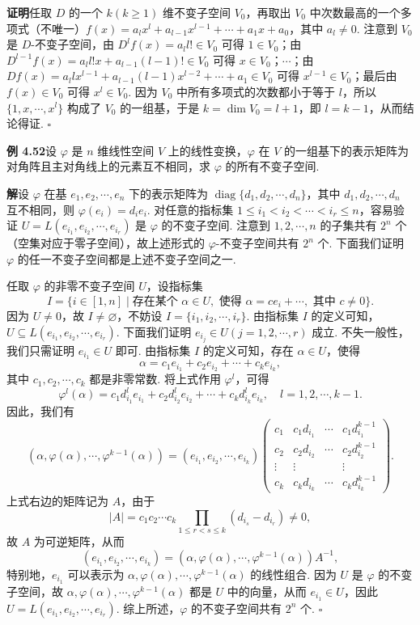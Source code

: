 \documentclass[UTF8,12pt,a4paper,fontset=fandol]{ctexart}
\begin{document}
\noindent\textbf{证明}\quad 任取 $D$ 的一个 $k(k\ge1)$ 维不变子空间 $V_0$，再取出 $V_0$ 中次数最高的一个多项式（不唯一）$f(x)=a_lx^l+a_{l-1}x^{l-1}+\cdots+a_1x+a_0$，其中 $a_l\ne0$. 注意到 $V_0$ 是 $D$-不变子空间，由 $D^lf(x)=a_ll!\in V_0$ 可得 $1\in V_0$；由 $D^{l-1}f(x)=a_ll!x+a_{l-1}(l-1)!\in V_0$ 可得 $x\in V_0$；$\cdots$；由 $Df(x)=a_llx^{l-1}+a_{l-1}(l-1)x^{l-2}+\cdots+a_1\in V_0$ 可得 $x^{l-1}\in V_0$；最后由 $f(x)\in V_0$ 可得 $x^l\in V_0$. 因为 $V_0$ 中所有多项式的次数都小于等于 $l$，所以 $\{1,x,\cdots,x^l\}$ 构成了 $V_0$ 的一组基，于是 $k=\dim V_0=l+1$，即 $l=k-1$，从而结论得证. $\square$

\noindent\textbf{例 4.52}\quad 设 $\varphi$ 是 $n$ 维线性空间 $V$ 上的线性变换，$\varphi$ 在 $V$ 的一组基下的表示矩阵为对角阵且主对角线上的元素互不相同，求 $\varphi$ 的所有不变子空间.

\noindent\textbf{解}\quad 设 $\varphi$ 在基 $e_1,e_2,\cdots,e_n$ 下的表示矩阵为 $\operatorname{diag}\{d_1,d_2,\cdots,d_n\}$，其中 $d_1,d_2,\cdots,d_n$ 互不相同，则 $\varphi(e_i)=d_ie_i$. 对任意的指标集 $1\le i_1<i_2<\cdots<i_r\le n$，容易验证 $U=L(e_{i_1},e_{i_2},\cdots,e_{i_r})$ 是 $\varphi$ 的不变子空间. 注意到 $1,2,\cdots,n$ 的子集共有 $2^n$ 个（空集对应于零子空间），故上述形式的 $\varphi$-不变子空间共有 $2^n$ 个. 下面我们证明 $\varphi$ 的任一不变子空间都是上述不变子空间之一.

任取 $\varphi$ 的非零不变子空间 $U$，设指标集
\[
I=\{i\in[1,n]\mid \text{存在某个 }\alpha\in U,\text{ 使得 }\alpha=ce_i+\cdots,\text{ 其中 }c\ne0\}.
\]
因为 $U\ne0$，故 $I\ne\varnothing$，不妨设 $I=\{i_1,i_2,\cdots,i_r\}$. 由指标集 $I$ 的定义可知，$U\subseteq L(e_{i_1},e_{i_2},\cdots,e_{i_r})$. 下面我们证明 $e_{i_j}\in U(j=1,2,\cdots,r)$ 成立. 不失一般性，我们只需证明 $e_{i_1}\in U$ 即可. 由指标集 $I$ 的定义可知，存在 $\alpha\in U$，使得
\[
\alpha=c_1e_{i_1}+c_2e_{i_2}+\cdots+c_ke_{i_k},
\]
其中 $c_1,c_2,\cdots,c_k$ 都是非零常数. 将上式作用 $\varphi^l$，可得
\[
\varphi^l(\alpha)=c_1d_{i_1}^le_{i_1}+c_2d_{i_2}^le_{i_2}+\cdots+c_kd_{i_k}^le_{i_k},\quad l=1,2,\cdots,k-1.
\]
因此，我们有
\[
(\alpha,\varphi(\alpha),\cdots,\varphi^{k-1}(\alpha))
=(e_{i_1},e_{i_2},\cdots,e_{i_k})
\left(\begin{array}{cccc}
c_1 & c_1d_{i_1} & \cdots & c_1d_{i_1}^{k-1}\\
c_2 & c_2d_{i_2} & \cdots & c_2d_{i_2}^{k-1}\\
\vdots & \vdots &        & \vdots\\
c_k & c_kd_{i_k} & \cdots & c_kd_{i_k}^{k-1}
\end{array}\right).
\]
上式右边的矩阵记为 $A$，由于
\[
|A|=c_1c_2\cdots c_k\prod_{1\le r<s\le k}(d_{i_s}-d_{i_r})\ne0,
\]
故 $A$ 为可逆矩阵，从而
\[
(e_{i_1},e_{i_2},\cdots,e_{i_k})=(\alpha,\varphi(\alpha),\cdots,\varphi^{k-1}(\alpha))A^{-1},
\]
特别地，$e_{i_1}$ 可以表示为 $\alpha,\varphi(\alpha),\cdots,\varphi^{k-1}(\alpha)$ 的线性组合. 因为 $U$ 是 $\varphi$ 的不变子空间，故 $\alpha,\varphi(\alpha),\cdots,\varphi^{k-1}(\alpha)$ 都是 $U$ 中的向量，从而 $e_{i_1}\in U$，因此 $U=L(e_{i_1},e_{i_2},\cdots,e_{i_r})$. 综上所述，$\varphi$ 的不变子空间共有 $2^n$ 个. $\square$
\end{document}
